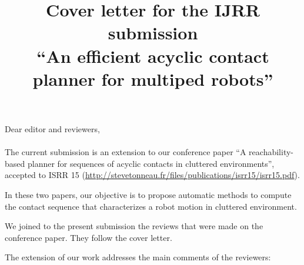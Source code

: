 \documentclass[a4paper]{article}
\author {}
\title {Cover letter for the IJRR submission \\ ``An efficient acyclic contact planner for multiped robots''}
\date {}
\begin{document}
\maketitle

Dear editor and reviewers, \\ \\

The current submission is an extension to our conference paper ``A reachability-based planner for sequences of acyclic contacts in
cluttered environments'', accepted to ISRR 15 (\url{http://stevetonneau.fr/files/publications/isrr15/isrr15.pdf}).

In these two papers, our objective is to propose automatic methods
to compute the contact sequence that characterizes a robot motion in
cluttered environment.

We joined to the present submission the reviews that were made on the
conference paper. They follow the cover letter.

The extension of our work addresses the main comments of the reviewers:
\end{document}
